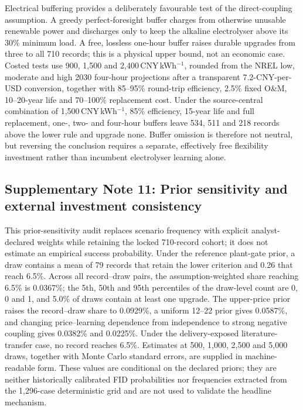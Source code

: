 \documentclass[pdflatex,sn-nature]{sn-jnl}
\begin{document}
Electrical buffering provides a deliberately favourable test of the direct-coupling assumption. A greedy perfect-foresight buffer charges from otherwise unusable renewable power and discharges only to keep the alkaline electrolyser above its 30\% minimum load. A free, lossless one-hour buffer raises durable upgrades from three to all 710 records; this is a physical upper bound, not an economic case. Costed tests use 900, 1,500 and 2,400\,CNY\,kWh$^{-1}$, rounded from the NREL low, moderate and high 2030 four-hour projections after a transparent 7.2-CNY-per-USD conversion, together with 85--95\% round-trip efficiency, 2.5\% fixed O\&M, 10--20-year life and 70--100\% replacement cost\cite{cole2023battery,nrelatb2023}. Under the source-central combination of 1,500\,CNY\,kWh$^{-1}$, 85\% efficiency, 15-year life and full replacement, one-, two- and four-hour buffers leave 534, 511 and 218 records above the lower rule and upgrade none. Buffer omission is therefore not neutral, but reversing the conclusion requires a separate, effectively free flexibility investment rather than incumbent electrolyser learning alone.

\subsection*{Supplementary Note 11: Prior sensitivity and external investment consistency}

This prior-sensitivity audit replaces scenario frequency with explicit analyst-declared weights while retaining the locked 710-record cohort; it does not estimate an empirical success probability. Under the reference plant-gate prior, a draw contains a mean of 79 records that retain the lower criterion and 0.26 that reach 6.5\%. Across all record--draw pairs, the assumption-weighted share reaching 6.5\% is 0.0367\%; the 5th, 50th and 95th percentiles of the draw-level count are 0, 0 and 1, and 5.0\% of draws contain at least one upgrade. The upper-price prior raises the record--draw share to 0.0929\%, a uniform 12--22 prior gives 0.0587\%, and changing price--learning dependence from independence to strong negative coupling gives 0.0382\% and 0.0225\%. Under the delivery-exposed literature-transfer case, no record reaches 6.5\%. Estimates at 500, 1,000, 2,500 and 5,000 draws, together with Monte Carlo standard errors, are supplied in machine-readable form. These values are conditional on the declared priors; they are neither historically calibrated FID probabilities nor frequencies extracted from the 1,296-case deterministic grid and are not used to validate the headline mechanism.
\end{document}
